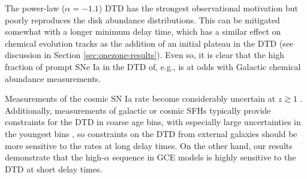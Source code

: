 \documentclass[twocolumn,twocolappendix,linenumbers]{aastex631}
\begin{document}

The power-law ($\alpha=-1.1$) DTD has the strongest observational motivation but poorly reproduces the disk abundance distributions. This can be mitigated somewhat with a longer minimum delay time, which has a similar effect on chemical evolution tracks as the addition of an initial plateau in the DTD (see discussion in Section \ref{sec:onezone-results}). Even so, it is clear that the high fraction of prompt SNe Ia in the DTD of, e.g., \citet{MaozMannucci2012-SNeIaReview} is at odds with Galactic chemical abundance measurements. 

Measurements of the cosmic SN Ia rate become considerably uncertain at $z\gtrsim1$ \citep[see, e.g.,][]{Palicio2024-CosmicSNIaRate}. Additionally, measurements of galactic or cosmic SFHs typically provide constraints for the DTD in coarse age bins, with especially large uncertainties in the youngest bins \citep[e.g.,][]{MaozMannucci2012-SNeIaReview},
so constraints on the DTD from external galaxies should be more sensitive to the rates at long delay times. On the other hand, our results demonstrate that the high-$\alpha$ sequence in GCE models is highly sensitive to the DTD at short delay times.
\end{document}

